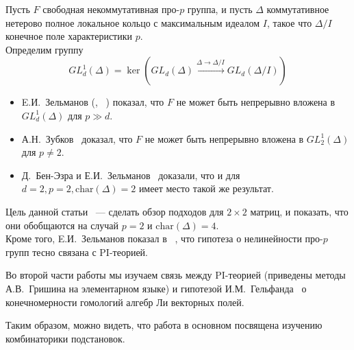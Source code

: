 \noindent
Пусть $F$ свободная некоммутативная про-$p$ группа, и пусть $\Delta$ коммутативное нетерово полное локальное кольцо с максимальным идеалом $I$, такое что
$\Delta/I$ конечное поле характеристики $p$.\\
Определим группу
\[GL_d^1(\Delta) = \ker\left( GL_d(\Delta) \xrightarrow{\Delta\to\Delta/I} GL_d(\Delta/I) \right)\]
\begin{itemize}
    \item E.И.\ Зельманов (\cite{Zelmanov1}, ~\cite{Zelmanov2}) показал, что $F$ не может быть непрерывно вложена в $GL_d^1(\Delta)$ для $p\gg d$.
    \item А.Н.\ Зубков~\cite{Zubkov} доказал, что $F$ не может быть непрерывно вложена в $GL_2^1(\Delta)$ для $p\neq2$.
    \item Д.\ Бен-Эзра и Е.И.\ Зельманов~\cite{Ben-Ezra-Zelmanov} доказали, что и для\\$d=2, p=2, \mathrm{char}(\Delta)=2$ имеет место такой же результат.
\end{itemize}

Цель данной статьи ~--- сделать обзор подходов для $2\times2$ матриц, и показать, что они обобщаются на случай $p=2$ и $\mathrm{char}(\Delta)=4$.\\
Кроме того, E.И.\ Зельманов показал в ~\cite{Zelmanov1}, что гипотеза о нелинейности про-$p$ групп тесно связана с PI-теорией.

Во второй части работы мы изучаем связь между PI-теорией (приведены методы А.В.\ Гришина на элементарном языке)
и гипотезой И.М.\ Гельфанда~\cite{Gelfand} о конечномерности гомологий алгебр Ли векторных полей.

Таким образом, можно видеть, что работа в основном посвящена изучению комбинаторики подстановок.